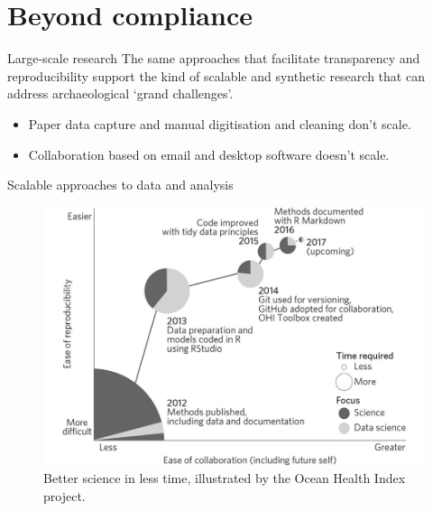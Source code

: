 \documentclass[aspectratio=169, 11pt]{beamer} %
\begin{document}
\section{Beyond compliance}

\begin{frame}{Large-scale research}
    The same approaches that facilitate transparency and reproducibility support the kind of scalable and synthetic research that can address archaeological `grand challenges'. \cite{Kintigh2014-ub}
        \begin{itemize}[label=\textbullet]
            \item Paper data capture and manual digitisation and cleaning don't scale.
            \item Collaboration based on email and desktop software doesn't scale.
    \end{itemize}
\end{frame}

\begin{frame}{Scalable approaches to data and analysis}
  \begin{figure}[H]
    \centering
        \includegraphics[height=.7\textheight]{figures/Ocean-Health-Index.jpg}
        \caption{Better science in less time, illustrated by the Ocean Health Index project. \cite{Stewart_Lowndes2017-lj}}
        \label{fig:stewart_lowndes}
  \end{figure}
\end{frame}
\end{document}
